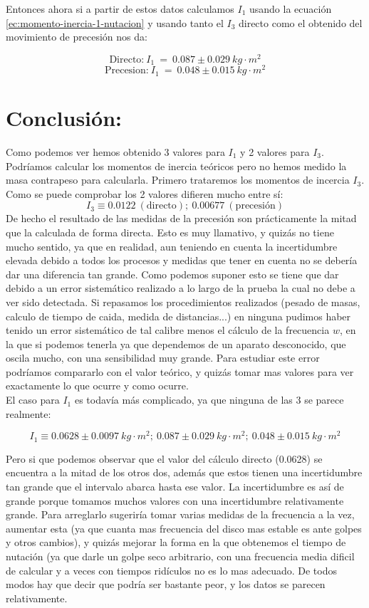 \documentclass[12pt,a4paper]{article}
\begin{document}
Entonces ahora si a partir de estos datos calculamos $I_1$ usando la ecuación \ref{ec:momento-inercia-1-nutacion} y usando tanto el $I_3$ directo como el obtenido del movimiento de precesión nos da:

$$\text{Directo:} \ I_1 \ = \ 0.087 \pm 0.029 \ kg \cdot m^2 $$
$$\text{Precesion:} \ I_1 \ = \ 0.048\pm 0.015 \ kg \cdot m^2  $$

\section{Conclusión:}

Como podemos ver hemos obtenido 3 valores para $I_1$ y 2 valores para $I_3$. Podríamos calcular los momentos de inercia teóricos pero no hemos medido la masa contrapeso para calcularla. Primero trataremos los momentos de incercia $I_3$. \\

Como se puede comprobar los 2 valores difieren mucho entre sí:
$$ I_3 \equiv 0.0122 \ (\text{directo}); \ 0.00677 \ (\text{precesión}) $$
De hecho el resultado de las medidas de la precesión son prácticamente la mitad que la calculada de forma directa. Esto es muy llamativo, y quizás no tiene mucho sentido, ya que en realidad, aun teniendo en cuenta la incertidumbre elevada debido a todos los procesos y medidas que tener en cuenta no se debería dar una diferencia tan grande. Como podemos suponer esto se tiene que dar debido a un error sistemático realizado a lo largo de la prueba la cual no debe a ver sido detectada. Si repasamos los procedimientos realizados (pesado de masas, calculo de tiempo de caida, medida de distancias...) en ninguna pudimos haber tenido un error sistemático de tal calibre menos el cálculo de la frecuencia $w$, en la que si podemos tenerla ya que dependemos de un aparato desconocido, que oscila mucho, con una sensibilidad muy grande. Para estudiar este error podríamos compararlo con el valor teórico, y quizás tomar mas valores para ver exactamente lo que ocurre y como ocurre. \\

El caso para $I_1$ es todavía más complicado, ya que ninguna de las 3 se parece realmente:

$$ I_1 \equiv 0.0628 \pm 0.0097 \ kg \cdot m^2; \ 0.087 \pm 0.029 \ kg \cdot m^2; \ 0.048  \pm 0.015 \ kg \cdot m^2  $$

Pero si que podemos observar que el valor del cálculo directo (0.0628) se encuentra a la mitad de los otros dos, además que estos tienen una incertidumbre tan grande que el intervalo abarca hasta ese valor. La incertidumbre es así de grande porque tomamos muchos valores con una incertidumbre relativamente grande. Para arreglarlo sugeriría tomar varias medidas de la frecuencia a la vez, aumentar esta (ya que cuanta mas frecuencia del disco mas estable es ante golpes y otros cambios), y quizás mejorar la forma en la que obtenemos el tiempo de nutación (ya que darle un golpe seco arbitrario, con una frecuencia media dificil de calcular y a veces con tiempos ridículos no es lo mas adecuado. De todos modos hay que decir que podría ser bastante peor, y los datos se parecen relativamente. \\
\end{document}

